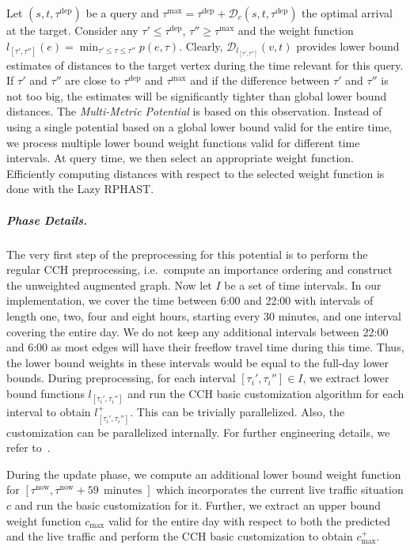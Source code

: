 \documentclass[a4paper,UKenglish,cleveref, autoref, thm-restate,anonymous]{lipics-v2021}
\newcommand*{\pred}{p}
\newcommand*{\comb}{c}
\newcommand*{\dist}{\mathcal{D}}
\newcommand*{\tdep}{\tau^{\operatorname{dep}}}
\newcommand*{\tmax}{\tau^{\max}}
\begin{document}
Let $(s,t,\tdep)$ be a query and $\tmax = \tdep + \dist_c(s,t,\tdep)$ the optimal arrival at the target.
Consider any $\tau' \leq \tdep$, $\tau'' \geq \tmax$ and the weight function $l_{[\tau', \tau'']}(e) = \min_{\tau' \leq \tau \leq \tau''}\pred(e, \tau)$. %
Clearly, $\dist_{l_{[\tau', \tau'']}}(v,t)$ provides lower bound estimates of distances to the target vertex during the time relevant for this query.
If $\tau'$ and $\tau''$ are close to $\tdep$ and $\tmax$ and if the difference between $\tau'$ and $\tau''$ is not too big, the estimates will be significantly tighter than global lower bound distances.
The \emph{Multi-Metric Potential} is based on this observation.
Instead of using a single potential based on a global lower bound valid for the entire time, we process multiple lower bound weight functions valid for different time intervals.
At query time, we then select an appropriate weight function.
Efficiently computing distances with respect to the selected weight function is done with the Lazy RPHAST.

\subparagraph{Phase Details.}
The very first step of the preprocessing for this potential is to perform the regular CCH preprocessing, i.e.\ compute an importance ordering and construct the unweighted augmented graph.
Now let $I$ be a set of time intervals.
In our implementation,
we cover the time between 6:00 and 22:00 with intervals of length one, two, four and eight hours, starting every 30 minutes,
and one interval covering the entire day.
We do not keep any additional intervals between 22:00 and 6:00 as most edges will have their freeflow travel time during this time.
Thus, the lower bound weights in these intervals would be equal to the full-day lower bounds.
During preprocessing, for each interval $[\tau_i', \tau_i''] \in I$, we extract lower bound functions $l_{[\tau_i', \tau_i'']}$ and run the CCH basic customization algorithm for each interval to obtain $l_{[\tau_i', \tau_i'']}^+$.
This can be trivially parallelized.
Also, the customization can be parallelized internally.
For further engineering details, we refer to~\cite{dsw-cch-15,bsw-rttau-19,ghuw-fbndocch-19}.

During the update phase, we compute an additional lower bound weight function for $[\tau^{\operatorname{now}}, \tau^{\operatorname{now}} + 59\,\operatorname{minutes}]$ which incorporates the current live traffic situation $\comb$ and run the basic customization for it.
Further, we extract an upper bound weight function $\comb_{\max}$ valid for the entire day with respect to both the predicted and the live traffic and perform the CCH basic customization to obtain $\comb^+_{\max}$.
\end{document}
